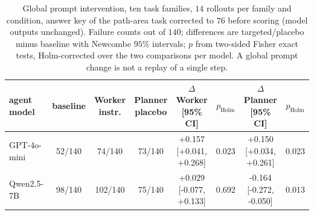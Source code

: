 \begin{table}[!t]
\caption{Global prompt intervention, ten task families, $14$ rollouts per family and condition, answer key of the path-area task corrected to $76$ before scoring (model outputs unchanged). Failure counts out of $140$; differences are targeted/placebo minus baseline with Newcombe $95\%$ intervals; $p$ from two-sided Fisher exact tests, Holm-corrected over the two comparisons per model. A global prompt change is not a replay of a single step.}
\label{tab:intervention}
\centering\small
\begin{tabular}{lccccccc}
\toprule
agent model & baseline & Worker instr. & Planner placebo & $\Delta$ Worker [95\% CI] & $p_{\mathrm{Holm}}$ & $\Delta$ Planner [95\% CI] & $p_{\mathrm{Holm}}$ \\
\midrule
GPT-4o-mini & 52/140 & 74/140 & 73/140 & +0.157 [+0.041, +0.268] & 0.023 & +0.150 [+0.034, +0.261] & 0.023 \\
Qwen2.5-7B & 98/140 & 102/140 & 75/140 & +0.029 [-0.077, +0.133] & 0.692 & -0.164 [-0.272, -0.050] & 0.013 \\
\bottomrule
\end{tabular}
\end{table}
